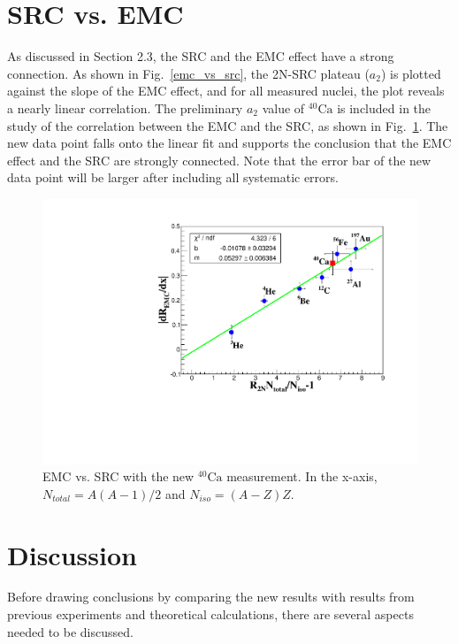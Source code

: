 \section{SRC vs. EMC}
  As discussed in Section 2.3, the SRC and the EMC effect have a strong connection. As shown in Fig.~\ref{emc_vs_src}, the 2N-SRC plateau ($a_{2}$) is plotted against the slope of the EMC effect, and for all measured nuclei, the plot reveals a nearly linear correlation. The preliminary $a_{2}$ value of $\mathrm{^{40}Ca}$ is included in the study of the correlation between the EMC and the SRC, as shown in Fig.~\ref{emc_vs_src_xgt2}. The new data point falls onto the linear fit and supports the conclusion that the EMC effect and the SRC are strongly connected. Note that the error bar of the new data point will be larger after including all systematic errors.
\begin{figure}[!ht]
  \begin{center}
    \includegraphics[type=pdf,ext=.pdf,read=.pdf,width=1.\textwidth]{./figures/xs/EMC_SRC_XGT2}
    \caption[EMC vs. SRC with the new $\mathrm{^{40}Ca}$ measurement]{\footnotesize{EMC vs. SRC with the new $\mathrm{^{40}Ca}$ measurement. In the x-axis, $N_{total}=A(A-1)/2$ and $N_{iso}=(A-Z) Z$.}}
    \label{emc_vs_src_xgt2}
  \end{center}
\end{figure}    

\section{Discussion}
 Before drawing conclusions by comparing the new results with results from previous experiments  and theoretical calculations, there are several aspects needed to be discussed.
 
